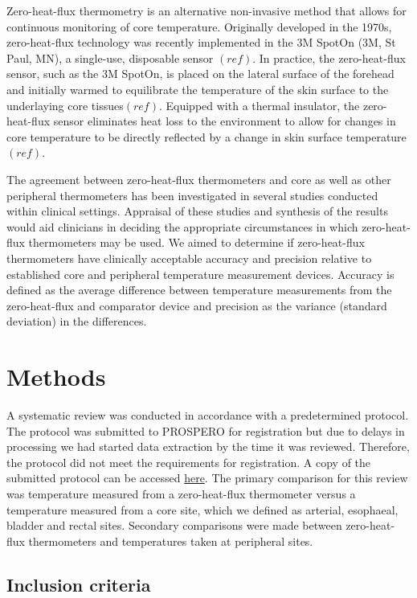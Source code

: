 \documentclass[smallextended]{svjour3}       %
\begin{document}
Zero-heat-flux thermometry is an alternative non-invasive method that
allows for continuous monitoring of core temperature. Originally
developed in the 1970s, zero-heat-flux technology was recently
implemented in the 3M SpotOn (3M, St Paul, MN), a single-use, disposable
sensor \((ref)\). In practice, the zero-heat-flux sensor, such as the 3M
SpotOn, is placed on the lateral surface of the forehead and initially
warmed to equilibrate the temperature of the skin surface to the
underlaying core tissues\((ref)\). Equipped with a thermal insulator,
the zero-heat-flux sensor eliminates heat loss to the environment to
allow for changes in core temperature to be directly reflected by a
change in skin surface temperature \((ref)\).

The agreement between zero-heat-flux thermometers and core as well as
other peripheral thermometers has been investigated in several studies
conducted within clinical settings. Appraisal of these studies and
synthesis of the results would aid clinicians in deciding the
appropriate circumstances in which zero-heat-flux thermometers may be
used. We aimed to determine if zero-heat-flux thermometers have
clinically acceptable accuracy and precision relative to established
core and peripheral temperature measurement devices. Accuracy is defined
as the average difference between temperature measurements from the
zero-heat-flux and comparator device and precision as the variance
(standard deviation) in the differences.

\hypertarget{methods}{%
\section{Methods}\label{methods}}

A systematic review was conducted in accordance with a predetermined
protocol. The protocol was submitted to PROSPERO for registration but
due to delays in processing we had started data extraction by the time
it was reviewed. Therefore, the protocol did not meet the requirements
for registration. A copy of the submitted protocol can be accessed
\href{insert\%20link}{here}. The primary comparison for this review was
temperature measured from a zero-heat-flux thermometer versus a
temperature measured from a core site, which we defined as arterial,
esophaeal, bladder and rectal sites. Secondary comparisons were made
between zero-heat-flux thermometers and temperatures taken at peripheral
sites.

\hypertarget{inclusion-criteria}{%
\subsection{Inclusion criteria}\label{inclusion-criteria}}
\end{document}
